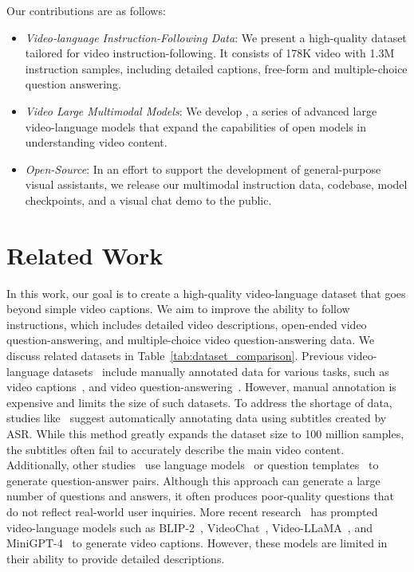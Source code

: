 Our contributions are as follows:
\begin{itemize}[leftmargin=7.5mm]
\setlength{\itemsep}{2pt}
\item {\it Video-language Instruction-Following Data}: We present a high-quality dataset \textit{\DataName} tailored for video instruction-following. It consists of 178K video with 1.3M instruction samples, including detailed captions, free-form and multiple-choice question answering.

\item {\it Video Large Multimodal Models}: We develop \textit{\ModelName}, a series of advanced large video-language models that expand the capabilities of open models in understanding video content.

\item {\it Open-Source}: In an effort to support the development of general-purpose visual assistants, we release our multimodal instruction data, codebase, model checkpoints, and a visual chat demo to the public.
\end{itemize}
\section{Related Work}

In this work, our goal is to create a high-quality video-language dataset that goes beyond simple video captions. We aim to improve the ability to follow instructions, which includes detailed video descriptions, open-ended video question-answering, and multiple-choice video question-answering data. We discuss related datasets in Table~\ref{tab:dataset_comparison}. Previous video-language datasets~\citep{miech19howto100m} include manually annotated data for various tasks, such as video captions~\citep{chen2011msvd,xu2016msrvtt,rohrbach2015LSMDC,anne2017didemo,caba2015activitynet,Zhou2017YouCookIID}, and video question-answering~\citep{yu2019activityqa,zadeh2019social,xiao2021next}. However, manual annotation is expensive and limits the size of such datasets. To address the shortage of data, studies like~\citep{miech19howto100m,lee2021acav100m,zellers2021merlot,xue2022hdvila} suggest automatically annotating data using subtitles created by ASR. While this method greatly expands the dataset size to 100 million samples, the subtitles often fail to accurately describe the main video content. Additionally, other studies~\citep{xu2017msvdqa,grunde2021agqa,wu2024star} use language models~\citep{xu2017msvdqa} or question templates~\citep{grunde2021agqa,wu2024star} to generate question-answer pairs. Although this approach can generate a large number of questions and answers, it often produces poor-quality questions that do not reflect real-world user inquiries. More recent research~\citep{chen2024panda70m} has prompted video-language models such as BLIP-2~\citep{li2023blip2bootstrappinglanguageimagepretraining}, VideoChat~\citep{li2024videochatchatcentricvideounderstanding}, Video-LLaMA~\citep{damonlpsg2023videollama}, and MiniGPT-4~\citep{zhu2023minigpt} to generate video captions. However, these models are limited in their ability to provide detailed descriptions. 

